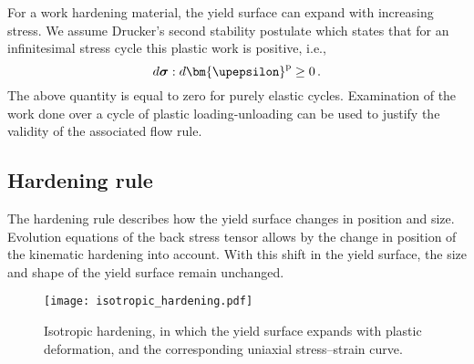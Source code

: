 For a work hardening material, the yield surface can expand with increasing stress.
We assume Drucker's second stability postulate which states that for an infinitesimal stress cycle this plastic work is positive, i.e.,
\begin{equation}
d\boldsymbol{\sigma}: d{{\bm{\upepsilon }}^{\rm{p}}} \ge 0 \,.
\end{equation}
The above quantity is equal to zero for purely elastic cycles.
Examination of the work done over a cycle of plastic loading-unloading can be used to justify the validity of the associated flow rule.

\subsection{Hardening rule}
\noindent
The hardening rule describes how the yield surface changes in position and size.
Evolution equations of the back stress tensor allows by the change in position of the kinematic hardening into account.
With this shift in the yield surface, the size and shape of the yield surface remain unchanged.

\begin{figure}[htbp]
	\centering
	\texttt{[image: isotropic\_hardening.pdf]}
	\caption{Isotropic hardening, in which the yield surface expands with plastic deformation, and the corresponding uniaxial stress–strain curve.}
	\label{Fig:isotropic_hardening}
\end{figure}

